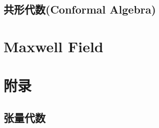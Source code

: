 \documentclass{article}
\begin{document}
\subsection{共形代数(Conformal Algebra)}




\section{Maxwell Field}































\section{附录}
\subsection{张量代数}
\end{document}

